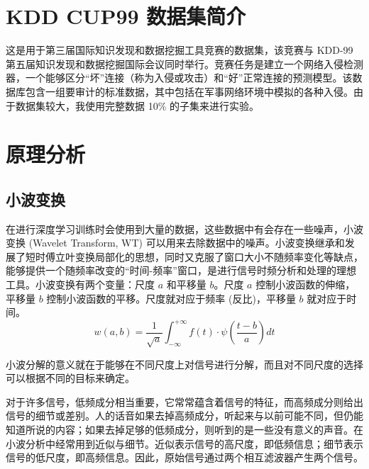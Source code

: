 \documentclass[12pt,AutoFakeBold]{article}
\begin{document}
\maketitle
\setcounter{tocdepth}{2}

\tableofcontents  %

\makeatletter
\begin{center}
    \LARGE \textbf{\textsf{\@problem}}
\end{center}
\makeatother


\section{KDD CUP99 数据集简介}

这是用于第三届国际知识发现和数据挖掘工具竞赛的数据集，该竞赛与 KDD-99 第五届知识发现和数据挖掘国际会议同时举行。竞赛任务是建立一个网络入侵检测器，一个能够区分“坏”连接（称为入侵或攻击）和“好”正常连接的预测模型。该数据库包含一组要审计的标准数据，其中包括在军事网络环境中模拟的各种入侵。由于数据集较大，我使用完整数据 10\% 的子集来进行实验。

\section{原理分析}

\subsection{小波变换}

在进行深度学习训练时会使用到大量的数据，这些数据中有会存在一些噪声，小波变换 (Wavelet Transform, WT) 可以用来去除数据中的噪声。小波变换继承和发展了短时傅立叶变换局部化的思想，同时又克服了窗口大小不随频率变化等缺点，能够提供一个随频率改变的“时间-频率”窗口，是进行信号时频分析和处理的理想工具。小波变换有两个变量：尺度 $a$ 和平移量 $b$。尺度 $a$ 控制小波函数的伸缩，平移量 $b$ 控制小波函数的平移。尺度就对应于频率 (反比)，平移量 $b$ 就对应于时间。
%
\begin{equation}
w(a, b)=\frac{1}{\sqrt{a}} \int_{-\infty}^{+\infty} f(t) \cdot \psi\left(\frac{t-b}{a}\right) d t
\end{equation}

小波分解的意义就在于能够在不同尺度上对信号进行分解，而且对不同尺度的选择可以根据不同的目标来确定。

对于许多信号，低频成分相当重要，它常常蕴含着信号的特征，而高频成分则给出信号的细节或差别。人的话音如果去掉高频成分，听起来与以前可能不同，但仍能知道所说的内容；如果去掉足够的低频成分，则听到的是一些没有意义的声音。在小波分析中经常用到近似与细节。近似表示信号的高尺度，即低频信息；细节表示信号的低尺度，即高频信息。因此，原始信号通过两个相互滤波器产生两个信号。
\end{document}
